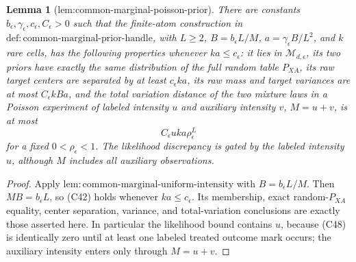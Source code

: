 \documentclass{article}
\newtheorem{lemma}{Lemma}
\begin{document}
\begin{lemma}[lem:common-marginal-poisson-prior]\label{lem:common-marginal-poisson-prior}
There are constants \(b_\epsilon,\gamma_\epsilon,c_\epsilon,C_\epsilon>0\) such that the finite-atom construction in \(\mathrm{def:common\mbox{-}marginal\mbox{-}prior\mbox{-}handle}\), with \(L\ge2\), \(B=b_\epsilon L/M\), \(a=\gamma_\epsilon B/L^2\), and \(k\) rare cells, has the following properties whenever \(ka\le c_\epsilon\): it lies in \(\mathcal M_{d,\epsilon}\), its two priors have exactly the same distribution of the full random table \(P_{XA}\), its raw target centers are separated by at least \(c_\epsilon ka\), its raw mass and target variances are at most \(C_\epsilon kBa\), and the total variation distance of the two mixture laws in a Poisson experiment of labeled intensity \(u\) and auxiliary intensity \(v\), \(M=u+v\), is at most
\[
 C_\epsilon uka\rho_\epsilon^L
\]
for a fixed \(0<\rho_\epsilon<1\).  The likelihood discrepancy is gated by the labeled intensity \(u\), although \(M\) includes all auxiliary observations.
\end{lemma}
\begin{proof}
Apply \(\mathrm{lem:common\mbox{-}marginal\mbox{-}uniform\mbox{-}intensity}\) with \(B=b_\epsilon L/M\).  Then \(MB=b_\epsilon L\), so (C42) holds whenever \(ka\le c_\epsilon\).  Its membership, exact random-\(P_{XA}\) equality, center separation, variance, and total-variation conclusions are exactly those asserted here.  In particular the likelihood bound contains \(u\), because (C48) is identically zero until at least one labeled treated outcome mark occurs; the auxiliary intensity enters only through \(M=u+v\).
\end{proof}
\end{document}
